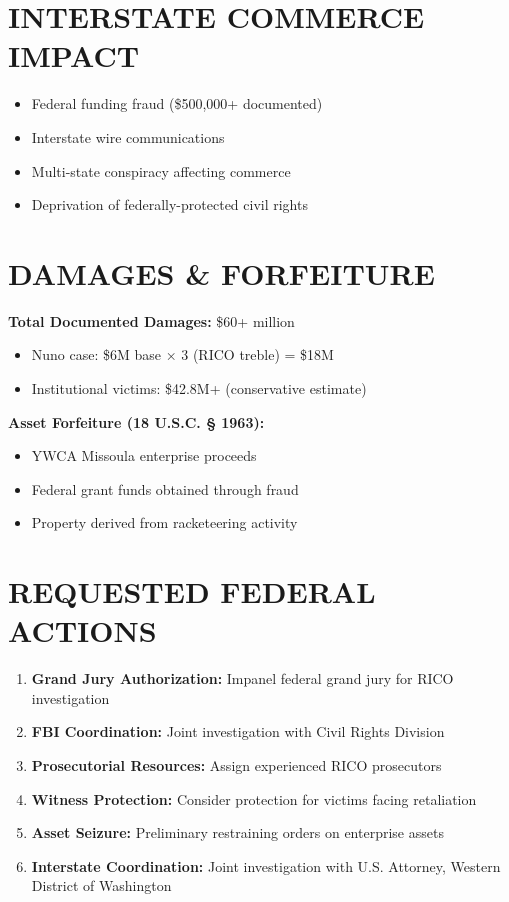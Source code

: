 \documentclass[12pt,oneside]{article}
\begin{document}
\begin{flushleft}
\section*{INTERSTATE COMMERCE IMPACT}

\begin{itemize}
\item Federal funding fraud (\$500,000+ documented)
\item Interstate wire communications
\item Multi-state conspiracy affecting commerce
\item Deprivation of federally-protected civil rights
\end{itemize}

\section*{DAMAGES \& FORFEITURE}

\textbf{Total Documented Damages:} \$60+ million
\begin{itemize}
\item Nuno case: \$6M base × 3 (RICO treble) = \$18M
\item Institutional victims: \$42.8M+ (conservative estimate)
\end{itemize}

\textbf{Asset Forfeiture (18 U.S.C. § 1963):}
\begin{itemize}
\item YWCA Missoula enterprise proceeds
\item Federal grant funds obtained through fraud
\item Property derived from racketeering activity
\end{itemize}

\section*{REQUESTED FEDERAL ACTIONS}

\begin{enumerate}
\item \textbf{Grand Jury Authorization:} Impanel federal grand jury for RICO investigation
\item \textbf{FBI Coordination:} Joint investigation with Civil Rights Division
\item \textbf{Prosecutorial Resources:} Assign experienced RICO prosecutors
\item \textbf{Witness Protection:} Consider protection for victims facing retaliation
\item \textbf{Asset Seizure:} Preliminary restraining orders on enterprise assets
\item \textbf{Interstate Coordination:} Joint investigation with U.S. Attorney, Western District of Washington
\end{enumerate}


\end{flushleft}
\end{document}
